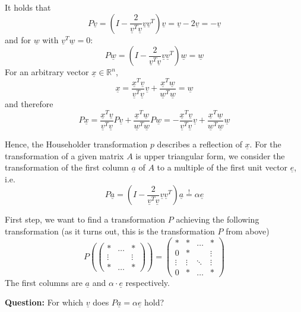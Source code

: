 \documentclass{article}
\begin{document}
It holds that
\[ P \underline{v} = \left(I - \frac{2}{\underline{v}^T \underline{v}} \underline{v} \underline{v}^T\right) \underline{v} = \underline{v} - 2\underline{v} = -\underline{v} \]
and for $\underline{w}$ with $\underline{v}^T \underline{w} = 0$:
\[ P \underline{w} = \left(I - \frac{2}{\underline{v}^T \underline{v}} \underline{v} \underline{v}^T\right) \underline{w} = \underline{w} \]
For an arbitrary vector $\underline{x} \in \mathbb R^n$,
\[ \underline{x} = \frac{\underline{x}^T \underline{v}}{\underline{v}^T \underline{v}} \underline{v} + \frac{\underline{x}^T \underline{w}}{\underline{w}^T \underline{w}} = \underline{w} \]
and therefore
\[ P \underline{x} = \frac{\underline{x}^T \underline{v}}{\underline{v}^T \underline{v}} P \underline{v} + \frac{\underline{x}^T \underline{w}}{\underline{w}^T \underline{w}} P \underline{w} = - \frac{\underline{x}^T \underline{v}}{\underline{v}^T \underline{v}} \underline{v} + \frac{\underline{x}^T \underline{w}}{\underline{w}^T \underline{w}} \underline{w} \]

Hence, the Householder transformation $p$ describes a reflection of $\underline{x}$.
For the transformation of a given matrix $A$ is upper triangular form, we consider the transformation of the first column $\underline{a}$ of $A$ to a multiple of the first unit vector $\underline{e}$, i.e.
\[ P \underline{a} = \left(I - \frac{2}{\underline{v}^T \underline{v}} \underline{v} \underline{v}^T\right) \underline{a} \stackrel{!}{=} \alpha \underline{e} \]

First step, we want to find a transformation $P$ achieving the following transformation (as it turns out, this is the transformation $P$ from above)
\[
  P\left(\begin{pmatrix}
    * & \ldots & * \\
    \vdots &   & \vdots \\
    * & \ldots & *
  \end{pmatrix}\right)
  =
  \begin{pmatrix}
    * & * & \ldots & * \\
    0 & * &        & \vdots \\
    \vdots & \vdots & \ddots & \vdots \\
    0 & * & \ldots & *
  \end{pmatrix}
\]
The first columns are $\underline{a}$ and $\alpha \cdot \underline{e}$ respectively.

\textbf{Question:}
For which $\underline{v}$ does $P \underline{a} = \alpha \underline{e}$ hold?
\end{document}
